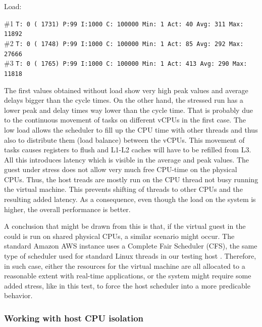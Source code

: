 \documentclass[]{scrartcl}
\begin{document}
\noindent Load:

\noindent \small \#1 \texttt{T: 0 ( 1731) P:99 I:1000 C: 100000 Min: 1 Act:   40 Avg:  311 Max:   11892}\\
\noindent \small \#2 \texttt{T: 0 ( 1748) P:99 I:1000 C: 100000 Min: 1 Act:   85 Avg:  292 Max:   27666}\\
\noindent \small \#3 \texttt{T: 0 ( 1765) P:99 I:1000 C: 100000 Min: 1 Act:  413 Avg:  290 Max:   11818}

\bigskip

The first values obtained without load show very high peak values and average delays bigger than the cycle times. On the other hand, the stressed run has a lower peak and delay times way lower than the cycle time. That is probably due to the continuous movement of tasks on different vCPUs in the first case. 
The low load allows the scheduler to fill up the CPU time with other threads and thus also to distribute them (load balance) between the vCPUs.
This movement of tasks causes registers to flush and L1-L2 caches will have to be refilled from L3. 
All this introduces latency which is visible in the average and peak values.
The guest under stress does not allow very much free CPU-time on the physical CPUs. Thus, the host treads are mostly run on the CPU thread not busy running the virtual machine. 
This prevents shifting of threads to other CPUs and the resulting added latency. As a consequence, even though the load on the system is higher, the overall performance is better. 

A conclusion that might be drawn from this is that, if the virtual guest in the could is run on shared physical CPUs, a similar scenario might occur. 
The standard Amazon AWS instance uses a Complete Fair Scheduler (CFS), the same type of scheduler used for standard Linux threads in our testing host \cite{xen01}.
Therefore, in such case, either the resources for the virtual machine are all allocated to a reasonable extent with real-time applications, or the system might require some added stress, like in this test, to force the host scheduler into a more predicable behavior. 

\subsubsection{Working with host CPU isolation}
\end{document}
